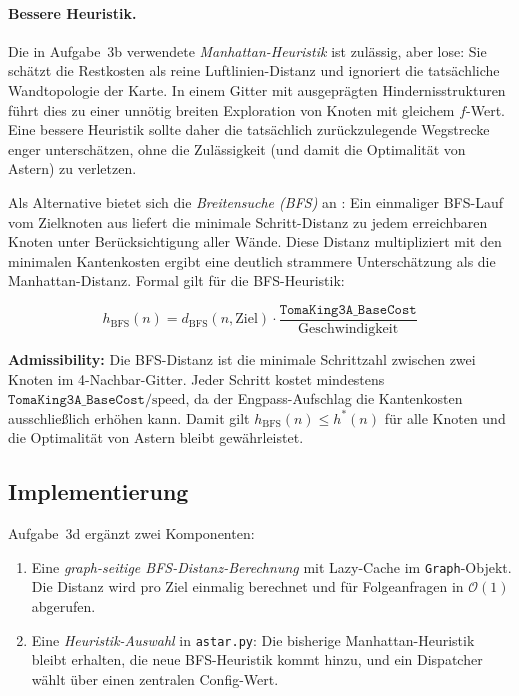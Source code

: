 \paragraph{Bessere Heuristik.}
Die in Aufgabe~3b verwendete \textit{Manhattan-Heuristik} ist zulässig, aber lose: Sie schätzt die Restkosten als reine Luftlinien-Distanz und ignoriert die tatsächliche Wandtopologie der Karte. In einem Gitter mit ausgeprägten Hindernisstrukturen führt dies zu einer unnötig breiten Exploration von Knoten mit gleichem \(f\)-Wert. Eine bessere Heuristik sollte daher die tatsächlich zurückzulegende Wegstrecke enger unter­schätzen, ohne die Zulässigkeit (und damit die Optimalität von \acs{Astern}) zu verletzen.

Als Alternative bietet sich die \textit{Breitensuche (\acs{BFS})} an \cite[S. 70\,f.]{4}: Ein einmaliger \acs{BFS}-Lauf vom Zielknoten aus liefert die minimale Schritt-Distanz zu jedem erreichbaren Knoten unter Berücksichtigung aller Wände. Diese Distanz multipliziert mit den minimalen Kantenkosten ergibt eine deutlich strammere Unterschätzung als die Manhattan-Distanz. Formal gilt für die \acs{BFS}-Heuristik:

\[
h_{\text{BFS}}(n) = d_{\text{BFS}}(n, \text{Ziel}) \cdot \frac{\texttt{TomaKing3A\_BaseCost}}{\text{Geschwindigkeit}}
\]

\textbf{Admissibility:} Die \acs{BFS}-Distanz ist die minimale Schrittzahl zwischen zwei Knoten im 4-Nachbar-Gitter. Jeder Schritt kostet mindestens \(\texttt{TomaKing3A\_BaseCost} / \text{speed}\), da der Engpass-Aufschlag die Kantenkosten ausschließlich erhöhen kann. Damit gilt \(h_{\text{BFS}}(n) \le h^*(n)\) für alle Knoten und die Optimalität von \acs{Astern} bleibt gewährleistet.

\subsection{Implementierung}

Aufgabe~3d ergänzt zwei Komponenten:
\begin{enumerate}
    \item Eine \textit{graph-seitige \acs{BFS}-Distanz-Berechnung} mit Lazy-Cache im \texttt{Graph}-Objekt. Die Distanz wird pro Ziel einmalig berechnet und für Folgeanfragen in \(\mathcal{O}(1)\) abgerufen.
    \item Eine \textit{Heuristik-Auswahl} in \texttt{astar.py}: Die bisherige Manhattan-Heuristik bleibt erhalten, die neue \acs{BFS}-Heuristik kommt hinzu, und ein Dispatcher wählt über einen zentralen Config-Wert.
\end{enumerate}

